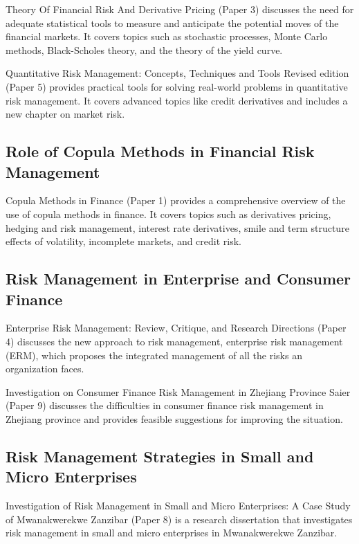 \documentclass{article}
\begin{document}
Theory Of Financial Risk And Derivative Pricing (Paper 3) discusses the need for adequate statistical tools to measure and anticipate the potential moves of the financial markets. It covers topics such as stochastic processes, Monte Carlo methods, Black-Scholes theory, and the theory of the yield curve.

Quantitative Risk Management: Concepts, Techniques and Tools Revised edition (Paper 5) provides practical tools for solving real-world problems in quantitative risk management. It covers advanced topics like credit derivatives and includes a new chapter on market risk.

\subsection{Role of Copula Methods in Financial Risk Management}

Copula Methods in Finance (Paper 1) provides a comprehensive overview of the use of copula methods in finance. It covers topics such as derivatives pricing, hedging and risk management, interest rate derivatives, smile and term structure effects of volatility, incomplete markets, and credit risk.

\subsection{Risk Management in Enterprise and Consumer Finance}

Enterprise Risk Management: Review, Critique, and Research Directions (Paper 4) discusses the new approach to risk management, enterprise risk management (ERM), which proposes the integrated management of all the risks an organization faces.

Investigation on Consumer Finance Risk Management in Zhejiang Province Saier (Paper 9) discusses the difficulties in consumer finance risk management in Zhejiang province and provides feasible suggestions for improving the situation.

\subsection{Risk Management Strategies in Small and Micro Enterprises}

Investigation of Risk Management in Small and Micro Enterprises: A Case Study of Mwanakwerekwe Zanzibar (Paper 8) is a research dissertation that investigates risk management in small and micro enterprises in Mwanakwerekwe Zanzibar.
\end{document}
